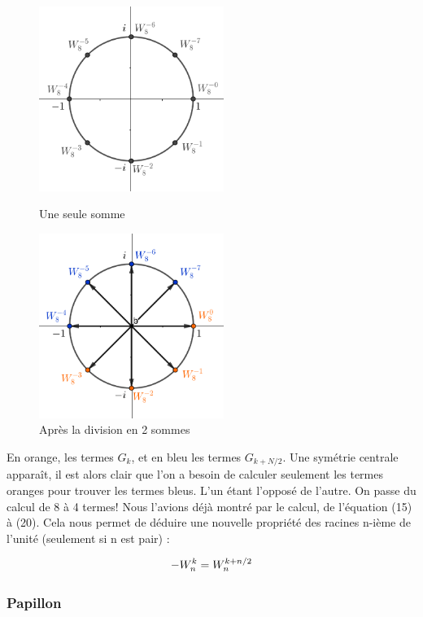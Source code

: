 \documentclass{article}
\begin{document}
\begin{figure}[!htb]
	\begin{minipage}{0.5\textwidth}
		\centering
		\includegraphics[height=6cm]{./assets/unitCircle.png}
		\caption{Une seule somme}
		\label{fig:split}
	\end{minipage}
	\hfill
	\begin{minipage}{0.5\textwidth}
		\centering
		\includegraphics[height=6cm]{./assets/unitCircleSplit.png}
		\caption{Après la division en 2 sommes}
		\label{fig:split2}
	\end{minipage}
\end{figure}

\noindent En orange, les termes $G_{k}$, et en bleu les termes $G_{k+N/2}$. Une symétrie centrale apparaît, il est alors clair que l'on a besoin de calculer seulement les termes oranges pour trouver les termes bleus. L'un étant l'opposé de l'autre. On passe du calcul de 8 à 4 termes! Nous l'avions déjà montré par le calcul, de l'équation (15) à (20). Cela nous permet de déduire une nouvelle propriété des racines n-ième de l'unité (seulement si n est pair) : 

\begin{equation}
	-\krootofunity{k}{n} = \krootofunity{k+n/2}{n}
\end{equation}

\subsubsection{Papillon}
\end{document}
